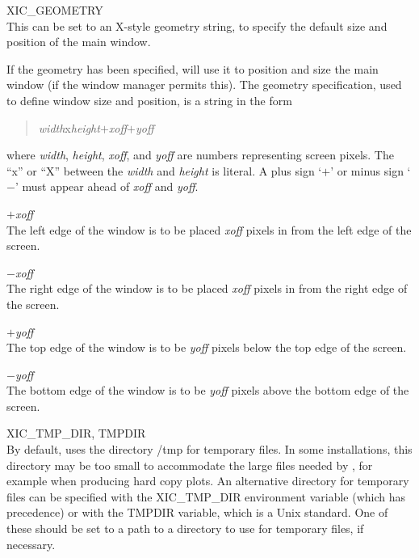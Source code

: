 \begin{description}
\item{\et XIC\_GEOMETRY}\\
This can be set to an X-style geometry string, to specify the 
default size and position of the {\Xic} main window.

If the geometry has been specified, {\Xic} will use it to position and
size the main window (if the window manager permits this).  The
geometry specification, used to define window size and position, is a
string in the form
\begin{quote}
{\it width\/}{\vt x}{\it height\/}$+${\it xoff\/}$+${\it yoff}
\end{quote}
where {\it width\/}, {\it height\/}, {\it xoff\/}, and {\it yoff} are
numbers representing screen pixels.  The ``{\vt x}'' or ``{\vt X}''
between the {\it width} and {\it height} is literal.  A plus sign
`$+$' or minus sign `$-$' must appear ahead of {\it xoff} and {\it
yoff}.

\begin{description}
\item{$+${\it xoff}}\\
The left edge of the window is to be placed {\it xoff} pixels in from
the left edge of the screen.

\item{$-${\it xoff}}\\
The right edge of the window is to be placed {\it xoff} pixels in from
the right edge of the screen.

\item{$+${\it yoff}}\\
The top edge of the window is to be {\it yoff} pixels below the top
edge of the screen.

\item{$-${\it yoff}}\\
The bottom edge of the window is to be {\it yoff} pixels above the
bottom edge of the screen.
\end{description}

\item{{\et XIC\_TMP\_DIR}, {\et TMPDIR}}\\
By default, {\Xic} uses the directory {\vt /tmp} for temporary files. 
In some installations, this directory may be too small to accommodate
the large files needed by {\Xic}, for example when producing hard copy
plots.  An alternative directory for temporary files can be specified
with the {\et XIC\_TMP\_DIR} environment variable (which has
precedence) or with the {\et TMPDIR} variable, which is a Unix
standard.  One of these should be set to a path to a directory to use
for temporary files, if necessary.


\end{description}
